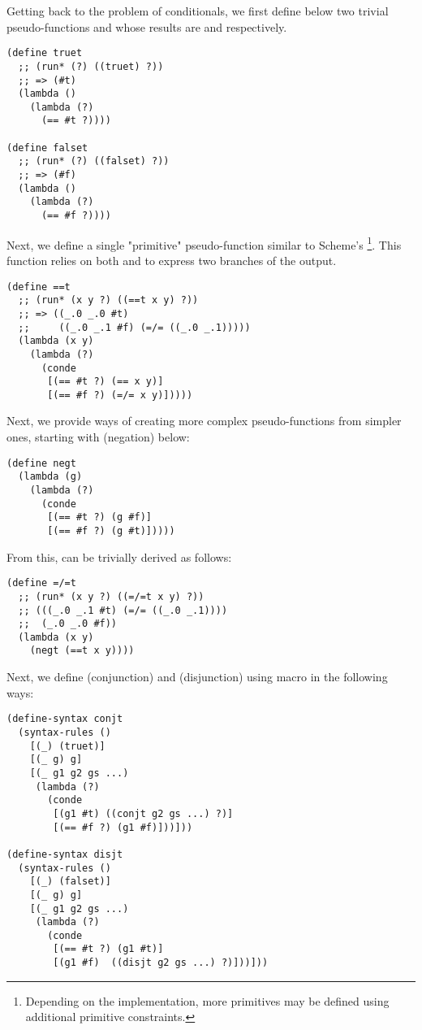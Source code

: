 Getting back to the problem of conditionals, we first define below two trivial pseudo-functions  and  whose results are  and  respectively.

\begin{lstlisting}
(define truet
  ;; (run* (?) ((truet) ?))
  ;; => (#t)
  (lambda ()
    (lambda (?)
      (== #t ?))))

(define falset
  ;; (run* (?) ((falset) ?))
  ;; => (#f)
  (lambda ()
    (lambda (?)
      (== #f ?))))
\end{lstlisting}

Next, we define a single "primitive" pseudo-function similar to Scheme's \footnote{Depending on the implementation, more primitives may be defined using additional primitive constraints.}. This function relies on both \code{==} and \code{=/=} to express two branches of the output.
\begin{lstlisting}
(define ==t
  ;; (run* (x y ?) ((==t x y) ?))
  ;; => ((_.0 _.0 #t)
  ;;     ((_.0 _.1 #f) (=/= ((_.0 _.1)))))
  (lambda (x y)
    (lambda (?)
      (conde
       [(== #t ?) (== x y)]
       [(== #f ?) (=/= x y)]))))
\end{lstlisting}

Next, we provide ways of creating more complex pseudo-functions from simpler ones, starting with  (negation) below:
\begin{lstlisting}
(define negt
  (lambda (g)
    (lambda (?)
      (conde
       [(== #t ?) (g #f)]
       [(== #f ?) (g #t)]))))
\end{lstlisting}

From this,  can be trivially derived as follows:
\begin{lstlisting}
(define =/=t
  ;; (run* (x y ?) ((=/=t x y) ?))
  ;; (((_.0 _.1 #t) (=/= ((_.0 _.1))))
  ;;  (_.0 _.0 #f))
  (lambda (x y)
    (negt (==t x y))))
\end{lstlisting}

Next, we define  (conjunction) and  (disjunction) using macro in the following ways:
\begin{lstlisting}
(define-syntax conjt
  (syntax-rules ()
    [(_) (truet)]
    [(_ g) g]
    [(_ g1 g2 gs ...)
     (lambda (?)
       (conde
        [(g1 #t) ((conjt g2 gs ...) ?)]
        [(== #f ?) (g1 #f)]))]))

(define-syntax disjt
  (syntax-rules ()
    [(_) (falset)]
    [(_ g) g]
    [(_ g1 g2 gs ...)
     (lambda (?)
       (conde
        [(== #t ?) (g1 #t)]
        [(g1 #f)  ((disjt g2 gs ...) ?)]))]))
\end{lstlisting}

